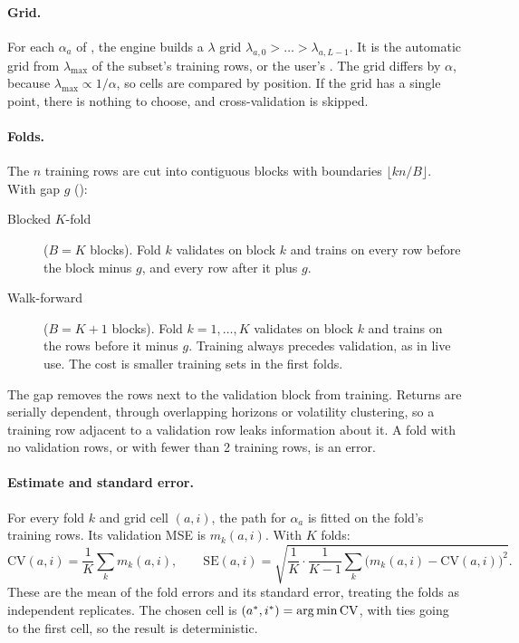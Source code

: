 \documentclass[11pt,a4paper]{article}
\begin{document}
\paragraph{Grid.} For each $\alpha_a$ of , the engine builds a $\lambda$ grid
$\lambda_{a,0}>\dots>\lambda_{a,L-1}$. It is the automatic grid from $\lambda_{\max}$ of the
subset's training rows, or the user's . The grid differs by $\alpha$, because
$\lambda_{\max}\propto1/\alpha$, so cells are compared by position. If the grid has a single
point, there is nothing to choose, and cross-validation is skipped.

\paragraph{Folds.} The $n$ training rows are cut into contiguous blocks with boundaries
$\lfloor kn/B\rfloor$. With gap $g$ ():
\begin{description}
  \item[Blocked $K$-fold] ($B=K$ blocks). Fold $k$ validates on block $k$ and trains on every
        row before the block minus $g$, and every row after it plus $g$.
  \item[Walk-forward] ($B=K+1$ blocks). Fold $k=1,\dots,K$ validates on block $k$ and trains on
        the rows before it minus $g$. Training always precedes validation, as in live use.
        The cost is smaller training sets in the first folds.
\end{description}
The gap removes the rows next to the validation block from training. Returns are serially
dependent, through overlapping horizons or volatility clustering, so a training row adjacent
to a validation row leaks information about it. A fold with no validation rows, or with fewer
than 2 training rows, is an error.

\paragraph{Estimate and standard error.} For every fold $k$ and grid cell $(a,i)$, the path for
$\alpha_a$ is fitted on the fold's training rows. Its validation MSE is $m_k(a,i)$. With $K$
folds:
\[
  \mathrm{CV}(a,i)=\frac1K\sum_km_k(a,i),\qquad
  \mathrm{SE}(a,i)=\sqrt{\frac{1}{K}\cdot\frac{1}{K-1}\sum_k\big(m_k(a,i)-\mathrm{CV}(a,i)\big)^2}.
\]
These are the mean of the fold errors and its standard error, treating the folds as
independent replicates. The chosen cell is $(a^\ast,i^\ast)=\operatorname*{arg\,min}\mathrm{CV}$, with ties going
to the first cell, so the result is deterministic.
\end{document}
